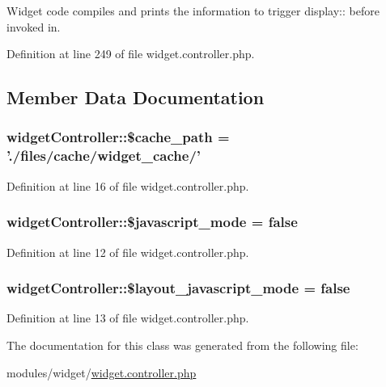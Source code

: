 Widget code compiles and prints the information to trigger display\-:\-: before invoked in. 



Definition at line 249 of file widget.\-controller.\-php.



\subsection{Member Data Documentation}
\hypertarget{classwidgetController_a279375b189444d13250d8111910655c3}{
\subsubsection[{\$cache\-\_\-path}]{\setlength{\rightskip}{0pt plus 5cm}widget\-Controller\-::\$cache\-\_\-path = './files/cache/widget\-\_\-cache/'}}\label{classwidgetController_a279375b189444d13250d8111910655c3}


Definition at line 16 of file widget.\-controller.\-php.

\hypertarget{classwidgetController_a9879a9de581b205ffa63cc0297dcefab}{
\subsubsection[{\$javascript\-\_\-mode}]{\setlength{\rightskip}{0pt plus 5cm}widget\-Controller\-::\$javascript\-\_\-mode = false}}\label{classwidgetController_a9879a9de581b205ffa63cc0297dcefab}


Definition at line 12 of file widget.\-controller.\-php.

\hypertarget{classwidgetController_ab123ebb549e616c6e67bf79e73f56ac8}{
\subsubsection[{\$layout\-\_\-javascript\-\_\-mode}]{\setlength{\rightskip}{0pt plus 5cm}widget\-Controller\-::\$layout\-\_\-javascript\-\_\-mode = false}}\label{classwidgetController_ab123ebb549e616c6e67bf79e73f56ac8}


Definition at line 13 of file widget.\-controller.\-php.



The documentation for this class was generated from the following file\-:\begin{DoxyCompactItemize}
\item 
modules/widget/\hyperlink{widget_8controller_8php}{widget.\-controller.\-php}\end{DoxyCompactItemize}
